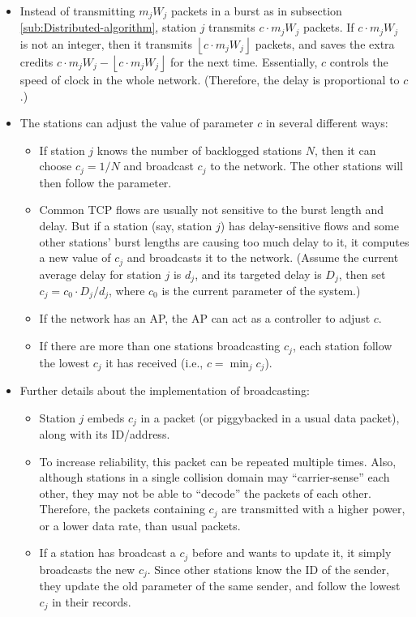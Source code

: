\documentclass[letterpaper, 10 pt, conference]{ieeeconf}
\begin{document}
\begin{itemize}
\item Instead of transmitting $m_{j}W_{j}$ packets in a burst as in subsection
\ref{sub:Distributed-algorithm}, station $j$ transmits $c\cdot m_{j}W_{j}$
packets. If $c\cdot m_{j}W_{j}$ is not an integer, then it transmits
$\left\lfloor c\cdot m_{j}W_{j}\right\rfloor $ packets, and saves
the extra credits $c\cdot m_{j}W_{j}-\left\lfloor c\cdot m_{j}W_{j}\right\rfloor $
for the next time. Essentially, $c$ controls the speed of clock in
the whole network. (Therefore, the delay is proportional to $c$.)
\item The stations can adjust the value of parameter $c$ in several different ways:

\begin{itemize}
\item If station $j$ knows the number of backlogged stations $N$, then
it can choose $c_{j}=1/N$ and broadcast $c_{j}$ to the network.
The other stations will then follow the parameter. 
\item Common TCP flows are usually not sensitive to the burst length and
delay. But if a station (say, station $j$) has delay-sensitive flows
and some other stations' burst lengths are causing too much delay
to it, it computes a new value of $c_{j}$ and broadcasts it to the
network. (Assume the current average delay for station $j$ is $d_{j}$,
and its targeted delay is $D_{j}$, then set $c_{j}=c_{0}\cdot D_{j}/d_{j}$,
where $c_{0}$ is the current parameter of the system.) 
\item If the network has an AP, the AP can act as a controller to adjust
$c$.
\item If there are more than one stations broadcasting $c_{j}$, each station
follow the lowest $c_{j}$ it has received (i.e., $c=\min_{j}c_{j}$).
\end{itemize}
\item Further details about the implementation of broadcasting: 

\begin{itemize}
\item Station $j$ embeds $c_{j}$ in a packet (or piggybacked in a usual
data packet), along with its ID/address. 
\item To increase reliability, this packet can be repeated multiple times.
Also, although stations in a single collision domain may {}``carrier-sense''
each other, they may not be able to {}``decode'' the packets of
each other. Therefore, the packets containing $c_{j}$ are transmitted
with a higher power, or a lower data rate, than usual packets. 
\item If a station has broadcast a $c_{j}$ before and wants to update it,
it simply broadcasts the new $c_{j}$. Since other stations know the
ID of the sender, they update the old parameter of the same sender,
and follow the lowest $c_{j}$ in their records.
\end{itemize}
\end{itemize}
\end{document}
